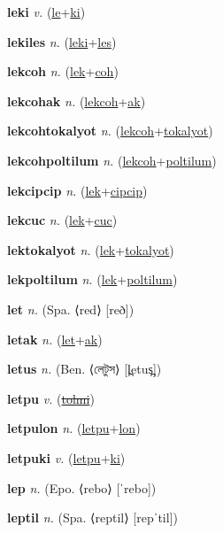\textbf{\hypertarget{leki}{leki}} \textit{v.} (\hyperlink{le}{le}+\allowbreak \hyperlink{ki}{ki})


\textbf{\hypertarget{lekiles}{lekiles}} \textit{n.} (\hyperlink{leki}{leki}+\allowbreak \hyperlink{les}{les})


\textbf{\hypertarget{lekcoh}{lekcoh}} \textit{n.} (\hyperlink{lek}{lek}+\allowbreak \hyperlink{coh}{coh})


\textbf{\hypertarget{lekcohak}{lekcohak}} \textit{n.} (\hyperlink{lekcoh}{lekcoh}+\allowbreak \hyperlink{ak}{ak})


\textbf{\hypertarget{lekcohtokalyot}{lekcohtokalyot}} \textit{n.} (\hyperlink{lekcoh}{lekcoh}+\allowbreak \hyperlink{tokalyot}{tokalyot})


\textbf{\hypertarget{lekcohpoltilum}{lekcohpoltilum}} \textit{n.} (\hyperlink{lekcoh}{lekcoh}+\allowbreak \hyperlink{poltilum}{poltilum})


\textbf{\hypertarget{lekcipcip}{lekcipcip}} \textit{n.} (\hyperlink{lek}{lek}+\allowbreak \hyperlink{cipcip}{cipcip})


\textbf{\hypertarget{lekcuc}{lekcuc}} \textit{n.} (\hyperlink{lek}{lek}+\allowbreak \hyperlink{cuc}{cuc})


\textbf{\hypertarget{lektokalyot}{lektokalyot}} \textit{n.} (\hyperlink{lek}{lek}+\allowbreak \hyperlink{tokalyot}{tokalyot})


\textbf{\hypertarget{lekpoltilum}{lekpoltilum}} \textit{n.} (\hyperlink{lek}{lek}+\allowbreak \hyperlink{poltilum}{poltilum})


\textbf{\hypertarget{let}{let}} \textit{n.} (Spa. ⟨red⟩ [reð])


\textbf{\hypertarget{letak}{letak}} \textit{n.} (\hyperlink{let}{let}+\allowbreak \hyperlink{ak}{ak})


\textbf{\hypertarget{letus}{letus}} \textit{n.} (Ben. ⟨{\bengali{}লেটুস}⟩ [l̪etus̪])


\textbf{\hypertarget{letpu}{letpu}} \textit{v.} (\hyperlink{tolmi}{\sout{tolmi}})


\textbf{\hypertarget{letpulon}{letpulon}} \textit{n.} (\hyperlink{letpu}{letpu}+\allowbreak \hyperlink{lon}{lon})


\textbf{\hypertarget{letpuki}{letpuki}} \textit{v.} (\hyperlink{letpu}{letpu}+\allowbreak \hyperlink{ki}{ki})


\textbf{\hypertarget{lep}{lep}} \textit{n.} (Epo. ⟨rebo⟩ [ˈrebo])


\textbf{\hypertarget{leptil}{leptil}} \textit{n.} (Spa. ⟨reptil⟩ [repˈtil])


